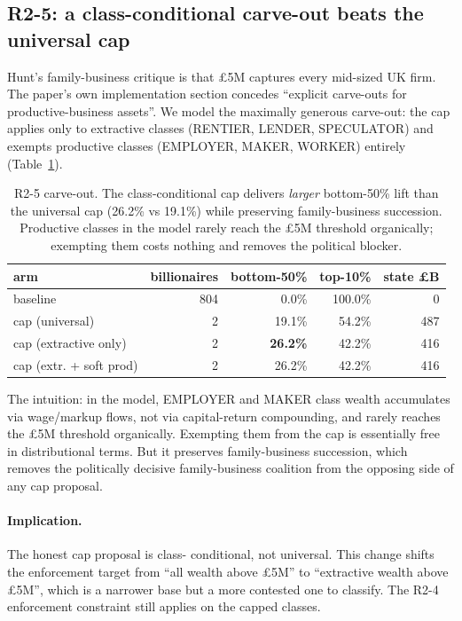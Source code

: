 \documentclass[11pt]{article}
\begin{document}
\subsection{R2-5: a class-conditional carve-out beats the universal
cap}

Hunt's family-business critique is that \pounds 5M captures every
mid-sized UK firm.  The paper's own implementation section concedes
``explicit carve-outs for productive-business assets''.  We model
the maximally generous carve-out: the cap applies only to
extractive classes (RENTIER, LENDER, SPECULATOR) and exempts
productive classes (EMPLOYER, MAKER, WORKER) entirely
(Table~\ref{tab:r2-carveout}).

\begin{table}[h]
\centering
\small
\caption{R2-5 carve-out.  The class-conditional cap delivers
\emph{larger} bottom-50\% lift than the universal cap (26.2\% vs
19.1\%) while preserving family-business succession.  Productive
classes in the model rarely reach the \pounds 5M threshold
organically; exempting them costs nothing and removes the
political blocker.}
\label{tab:r2-carveout}
\begin{tabular}{lrrrr}
\toprule
arm & billionaires & bottom-50\% & top-10\% & state \pounds B \\
\midrule
baseline               & 804 &  0.0\% & 100.0\% &   0 \\
cap (universal)        &   2 & 19.1\% &  54.2\% & 487 \\
cap (extractive only)  &   2 & \textbf{26.2\%} &  42.2\% & 416 \\
cap (extr. + soft prod)&   2 & 26.2\% &  42.2\% & 416 \\
\bottomrule
\end{tabular}
\end{table}

The intuition: in the model, EMPLOYER and MAKER class wealth
accumulates via wage/markup flows, not via capital-return
compounding, and rarely reaches the \pounds 5M threshold
organically.  Exempting them from the cap is essentially free in
distributional terms.  But it preserves family-business succession,
which removes the politically decisive family-business coalition
from the opposing side of any cap proposal.

\paragraph{Implication.}  The honest cap proposal is class-
conditional, not universal.  This change shifts the enforcement
target from ``all wealth above \pounds 5M'' to ``extractive wealth
above \pounds 5M'', which is a narrower base but a more contested
one to classify.  The R2-4 enforcement constraint still applies on
the capped classes.
\end{document}
